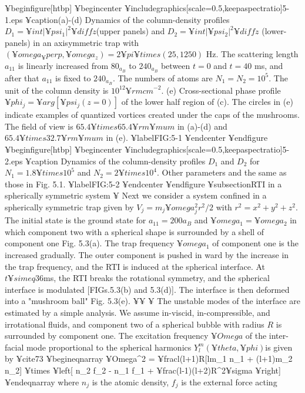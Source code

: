 {{{{{¥begin{figure}[htbp]
¥begin{center}
¥includegraphics[scale=0.5,keepaspectratio]{5-1.eps}
¥caption{(a)-(d) Dynamics of the column-density
profiles $D_1 = ¥int |¥psi_1|^2 ¥diff z$(upper panels) and
$D_2 = ¥int |¥psi_2|^2 ¥diff z$ (lower-panels) in an axisymmetric trap with
$( ¥omega_¥perp , ¥omega_z ) = 2 ¥pi ¥times (25, 1250)$ Hz.
The scattering length $a_{11}$ is linearly increased from $80_{a_B}$ to $240_{a_B}$
between $t=0$ and $t=40$ ms, and after that $a_{11}$ is fixed to $240_{a_B}$.
The numbers of atoms are $N_1 = N_2 = 10^5$. The unit of the column density
is $10^{12} {¥rm cm}^{-2}$. (e) Cross-sectional phase profile $¥phi_j = ¥arg [¥psi_j(z=0)]$
of the lower half region of (c). The circles in (e) indicate examples
of quantized vortices created under the caps of the mushrooms. The
field of view is $65.4 ¥times 65.4 {¥rm ¥mu m}$ in (a)-(d) and $65.4 ¥times 32.7 {¥rm ¥mu m}$ in (e).}
¥label{FIG:5-1}
¥end{center}
¥end{figure}
¥begin{figure}[htbp]
¥begin{center}
¥includegraphics[scale=0.5,keepaspectratio]{5-2.eps}
¥caption{
Dynamics of the column-density profiles
$D_1$ and $D_2$ for $N_1 = 1.8 ¥times 10^5$ and $N_2 = 2 ¥times 10^4$. Other parameters
and the same as those in Fig. 5.1.
}
¥label{FIG:5-2}
¥end{center}
¥end{figure}
¥subsection{RTI in a spherically symmetric system}
¥ Next we consider a system confined in a spherically symmetric
trap given by $V_j = m_j ¥omega^2_j r^2 / 2 $ with $r^2 = x^2+y^2+z^2$.
The initial state is the ground state for $a_{11}=200 a_B$ and
$¥omega_1 = ¥omega_2$ in which component two with a spherical shape is
surrounded by a shell of component one Fig. 5.3(a). The trap
frequency $¥omega_1$ of component one is the increased gradually.
The outer component is pushed in ward by the increase in the
trap frequency, and the RTI is induced at the spherical interface.
At $t ¥simeq 36$ms, the RTI breaks the rotational symmetry, and
the spherical interface is modulated [FIGs.5.3(b) and 5.3(d)].
The interface is then deformed into a "mushroom ball" Fig. 5.3(e).
¥¥
¥ The unstable modes of the interface are estimated by a
simple analysis. We assume in-viscid, in-compressible, and
irrotational fluids, and component two of a spherical bubble
with radius $R$ is surrounded by component one. The excitation
frequency $¥Omega$ of the inter-facial mode proportional to the
spherical harmonics $Y_l^m (¥theta, ¥phi)$is given by ¥cite{73}
¥begin{eqnarray}
¥Omega^2 = ¥frac{l(l+1)}{R[lm_1 n_1 + (l+1)m_2 n_2]}
¥times ¥left[ 
n_2 f_2 - n_1 f_1 + ¥frac{(l-1)(l+2)}{R^2}¥sigma
¥right]
¥end{eqnarray}
where $n_j$ is the atomic density, $f_j$ is the external force acting
}}}}}
